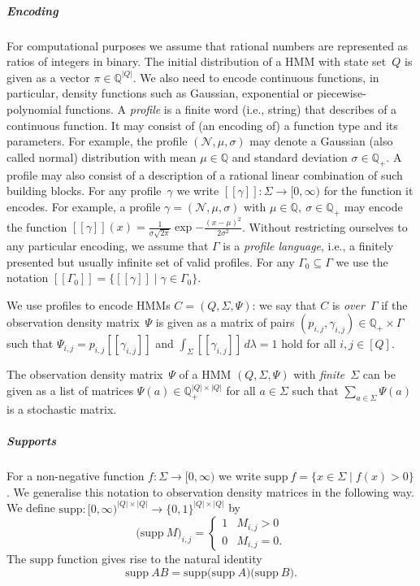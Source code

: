 \documentclass[a4paper,UKenglish,cleveref, autoref,mathscr]{lipics-v2019}
\newcommand{\QQ}{\mathbb{Q}}
\newcommand{\1}{\mathbbm{1}}
\newcommand{\supp}{\mathrm{supp}}
\begin{document}
\subparagraph*{Encoding}
For computational purposes we assume that rational numbers are represented as ratios of integers in binary.
The initial distribution of a HMM with state set~$Q$ is given as a vector $\pi \in \QQ^{|Q|}$.
We also need to encode continuous functions, in particular, density functions such as Gaussian, exponential or piecewise-polynomial functions.
A \emph{profile} is a finite word (i.e., string) that describes of a continuous function.
It may consist of (an encoding of) a function type and its parameters. For example, the profile  $(\mathcal{N}, \mu, \sigma)$ may denote a Gaussian (also called normal) distribution with mean $\mu \in \QQ$ and standard deviation $\sigma \in \QQ_+$. A profile may also consist of a description of a rational linear combination of such building blocks.
For any profile~$\gamma$ we write $[\![\gamma]\!] : \Sigma \rightarrow [0,\infty)$ for the function it encodes.
For example, a profile $\gamma = (\mathcal{N}, \mu, \sigma)$ with $\mu \in \QQ,\ \sigma \in \QQ_+$ may encode the function $[\![\gamma]\!](x) = \frac{1}{\sigma\sqrt{2\pi}} \exp{- \frac{(x - \mu)^2}{2\sigma^2}}$.
Without restricting ourselves to any particular encoding, we assume that $\Gamma$ is a \emph{profile language}, i.e., a finitely presented but usually infinite set of valid profiles. For any $\Gamma_0 \subseteq \Gamma$ we use the notation $[\![\Gamma_0]\!] = \{[\![\gamma]\!] \mid \gamma \in \Gamma_0\}$.

We use profiles to encode HMMs $C = (Q, \Sigma, \Psi)$:
we say that $C$ is \emph{over}~$\Gamma$ if the observation density matrix~$\Psi$ is given as a matrix of pairs $(p_{i,j}, \gamma_{i,j}) \in \QQ_+  \times \Gamma$ such that $\Psi_{i,j} = p_{i,j} [\![\gamma_{i,j}]\!]$ and $\int_{\Sigma} [\![\gamma_{i,j}]\!]\,d\lambda = 1$ hold for all $i,j \in [Q]$.

The observation density matrix~$\Psi$ of a HMM $(Q, \Sigma, \Psi)$ with \emph{finite}~$\Sigma$ can be given as a
list of matrices $\Psi(a) \in \QQ_+^{|Q| \times |Q|}$ for all $a \in \Sigma$ such that $\sum_{a \in \Sigma} \Psi(a)$ is a stochastic matrix.

\subparagraph*{Supports}
For a non-negative function $f : \Sigma \rightarrow [0,\infty)$ we write $\supp~f = \{x \in \Sigma \mid f(x) > 0\}$. We generalise this notation to observation density matrices in the following way. We define $\supp : [0,\infty)^{|Q| \times |Q|} \rightarrow \{0,1\}^{|Q| \times |Q|}$ by \begin{equation*}
\big(\supp ~M \big)_{i,j} = \begin{cases}
1 & M_{i,j}>0 \\
0 & M_{i,j}=0.
\end{cases}
\end{equation*}
The $\supp$ function gives rise to the natural identity
\[\supp ~AB = \supp \big(\supp~A \big)\big(\supp~B\big). \]
\end{document}
